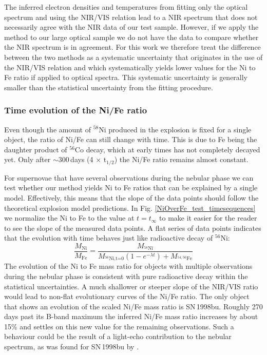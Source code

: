 \documentclass[fleqn,usenatbib]{mnras}
\begin{document}
The inferred electron densities and temperatures from fitting only the optical spectrum and using the NIR/VIS relation lead to a NIR spectrum that does not necessarily agree with the NIR data of our test sample. However, if we apply the method to our large optical sample we do not have the data to compare whether the NIR spectrum is in agreement. For this work we therefore treat the difference between the two methods as a systematic uncertainty that originates in the use of the NIR/VIS relation and which systematically yields lower values for the Ni to Fe ratio if applied to optical spectra. This systematic uncertainty is generally smaller than the statistical uncertainty from the fitting procedure.

\subsubsection{Time evolution of the Ni/Fe ratio}
Even though the amount of $^{58}$Ni produced in the explosion is fixed for a single object, the ratio of Ni/Fe can still change with time. This is due to Fe being the daughter product of $^{56}$Co decay, which at early times has not completely decayed yet. Only after $\sim300$\,days (4 $\times$ t$_{1/2}$) the Ni/Fe ratio remains almost constant. 

For supernovae that have several observations during the nebular phase we can test whether our method yields Ni to Fe ratios that can be explained by a single model. Effectively, this means that the slope of the data points should follow the theoretical explosion model predictions. In Fig. \ref{NiOverFe_test_timesequences} we normalize the Ni to Fe to the value at $t=t_\infty$ to make it easier for the reader to see the slope of the measured data points. A flat series of data points indicates that the evolution with time behaves just like radioactive decay of $^{56}$Ni:
\begin{equation}
    \frac{M_\text{Ni}}{M_\text{Fe}}= \frac{M_{^{58}\text{Ni}}}{M_{^{56}\text{Ni,t=0}}(1-e^{-\lambda t}) + M_{^{54,56}\text{Fe}}}
\end{equation}
The evolution of the Ni to Fe mass ratio for objects with multiple observations during the nebular phase is consistent with pure radioactive decay within the statistical uncertainties. A much shallower or steeper slope of the NIR/VIS ratio would lead to non-flat evolutionary curves of the Ni/Fe ratio. 
The only object that shows an evolution of the scaled Ni/Fe mass ratio is SN\,1998bu. Roughly 270 days past its B-band maximum the inferred Ni/Fe mass ratio increases by about 15\% and settles on this new value for the remaining observations. Such a behaviour could be the result of a light-echo contribution to the nebular spectrum, as was found for SN\,1998bu by \citet{2001ApJ...549L.215C}. 
\end{document}
